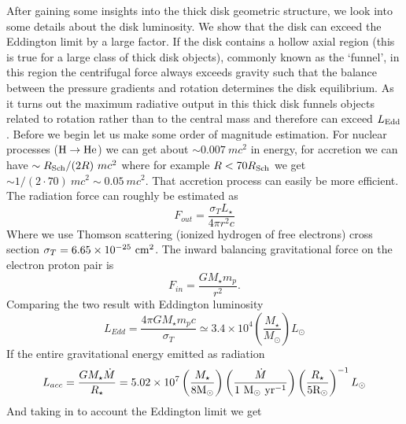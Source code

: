 \documentclass[a4paper,modern]{aastex62}
\def \msyr{~\rm{M_{\odot}}~\rm{yr^{-1}}}
\def \cm{~\rm{cm}}
\begin{document}
After gaining some insights into the thick disk geometric structure, we look into some details about the disk luminosity. We show that the disk can exceed the Eddington limit by a large factor. If the disk contains a hollow axial region (this is true for a large class of thick disk objects), commonly known as the `funnel’, in this region the centrifugal force always exceeds gravity such that the balance between the pressure gradients and rotation determines the disk equilibrium.
As it turns out the maximum radiative output in this thick disk funnels objects related to rotation rather than to the central mass and therefore can exceed $L_{\rm{Edd}}$.
Before we begin let us make some order of magnitude estimation. 
For nuclear processes ($\rm{H}\rightarrow \rm{He}$) we can get about $\sim 0.007~mc^2$ in energy, for accretion we can have $\sim R_{\rm{Sch}}/(2R) ~ mc^2$ where for example $R<70R_{\rm{Sch}}$ we get $\sim 1/(2\cdot 70) ~mc^2 \sim 0.05~mc^2$. That accretion process can easily be more efficient. 
The radiation force can roughly be estimated as 
\begin{equation}
F_{out}=\frac{\sigma_T L_\star}{4\pi r^2 c}
\end{equation}
Where we use Thomson scattering (ionized hydrogen of free electrons) cross section $\sigma_T=6.65 \times 10^{-25} \cm^2$.
The inward balancing gravitational force on the electron proton pair is 
\begin{equation}
F_{in}=\frac{GM_\star m_p}{r^2}.
\end{equation}
Comparing the two result with Eddington luminosity 
\begin{equation}
L_{Edd} = \frac{4\pi G M_\star m_p c}{\sigma_T}\simeq 3.4\times 10^4  \left( \frac{M_\star}{M_\odot} \right) L_\odot
\end{equation}
If the entire gravitational energy emitted as radiation 
\begin{equation}
L_{acc} = \frac{G M_\star \dot M}{R_\star} =
5.02 \times 10^7  \left(\frac{M_\star}{8 \rm{M_\odot}}\right) 
\left(\frac{\dot M}{1 \msyr}\right) 
\left(\frac{R_\star}{5 \rm{R_\odot}}\right)^{-1}   L_\odot
\end{equation}
And taking in to account the Eddington limit we get
\end{document}
